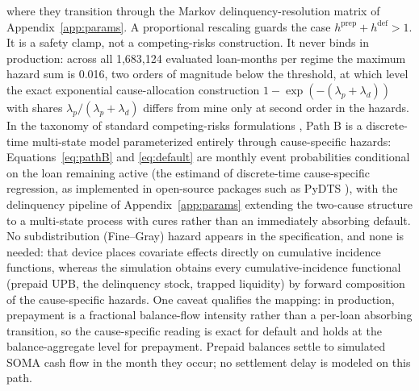 \documentclass[12pt]{article}
\begin{document}
where they transition through the Markov delinquency-resolution matrix of Appendix~\ref{app:params}. A proportional rescaling guards the case $h^{\mathrm{prep}} + h^{\mathrm{def}} > 1$. It is a safety clamp, not a competing-risks construction. It never binds in production: across all 1,683,124 evaluated loan-months per regime the maximum hazard sum is 0.016, two orders of magnitude below the threshold, at which level the exact exponential cause-allocation construction $1-\exp(-(\lambda_p+\lambda_d))$ with shares $\lambda_p/(\lambda_p+\lambda_d)$ differs from mine only at second order in the hazards. In the taxonomy of standard competing-risks formulations \citep{putter2007}, Path B is a discrete-time multi-state model parameterized entirely through cause-specific hazards: Equations~\eqref{eq:pathB} and \eqref{eq:default} are monthly event probabilities conditional on the loan remaining active (the estimand of discrete-time cause-specific regression, as implemented in open-source packages such as PyDTS \citep{meir2025}), with the delinquency pipeline of Appendix~\ref{app:params} extending the two-cause structure to a multi-state process with cures rather than an immediately absorbing default. No subdistribution (Fine--Gray) hazard \citep{fine1999} appears in the specification, and none is needed: that device places covariate effects directly on cumulative incidence functions, whereas the simulation obtains every cumulative-incidence functional (prepaid UPB, the delinquency stock, trapped liquidity) by forward composition of the cause-specific hazards. One caveat qualifies the mapping: in production, prepayment is a fractional balance-flow intensity rather than a per-loan absorbing transition, so the cause-specific reading is exact for default and holds at the balance-aggregate level for prepayment. Prepaid balances settle to simulated SOMA cash flow in the month they occur; no settlement delay is modeled on this path.
\end{document}
